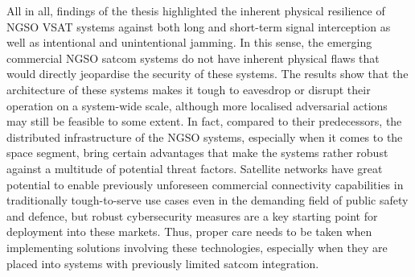 \documentclass[english, 12pt, a4paper, elec, utf8, a-1b, online]{aaltothesis}
\begin{document}
All in all, findings of the thesis highlighted the inherent physical resilience of NGSO VSAT systems against both long and short-term signal interception as well as intentional and unintentional jamming.
In this sense, the emerging commercial NGSO satcom systems do not have inherent physical flaws that would directly jeopardise the security of these systems.
The results show that the architecture of these systems makes it tough to eavesdrop or disrupt their operation on a system-wide scale, although more localised adversarial actions may still be feasible to some extent.
In fact, compared to their predecessors, the distributed infrastructure of the NGSO systems, especially when it comes to the space segment, bring certain advantages that make the systems rather robust against a multitude of potential threat factors.
Satellite networks have great potential to enable previously unforeseen commercial connectivity capabilities in traditionally tough-to-serve use cases even in the demanding field of public safety and defence, but robust cybersecurity measures are a key starting point for deployment into these markets.
Thus, proper care needs to be taken when implementing solutions involving these technologies, especially when they are placed into systems with previously limited satcom integration.

\clearpage

\thesisbibliography




\clearpage

\thesisappendix
\end{document}

